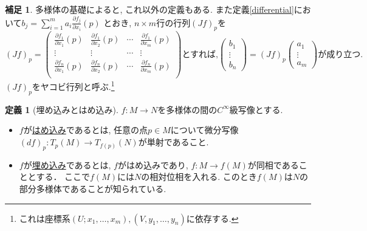 \documentclass[dvipdfmx,a4paper,11pt]{article}
\newcommand{\R}{\mathbb{R}}
\theoremstyle{definition}
\newtheorem{dfn}[thm]{定義}
\newtheorem{rem}[thm]{補足}
\newcommand{\pdrv}[2]{\frac{\partial #1}{\partial #2}}
\begin{document}
    
    \begin{rem}
 多様体の基礎によると, これ以外の定義もある.    
また定義\ref{differential}において$b_j = \sum_{i=1}^{m} a_i  \pdrv{f_{j}}{x_i}(p) $ とおき, $n \times m$行の行列$(Jf)_{p}$を
   $$
   (Jf)_{p} = 
   \begin{pmatrix}
   \pdrv{f_{1}}{x_1}(p) & \pdrv{f_{1}}{x_2}(p)  & \cdots & \pdrv{f_{1}}{x_m}(p) \\
   \vdots& \vdots& \cdots & \vdots \\
   \pdrv{f_{n}}{x_1}(p) & \pdrv{f_{n}}{x_2}(p)  & \cdots & \pdrv{f_{n}}{x_m}(p) \\
   \end{pmatrix}
   \text{とすれば,} 
   \begin{pmatrix}
   b_1 \\ \vdots \\ b_n 
   \end{pmatrix}
   =
   (Jf)_{p} 
   \begin{pmatrix}
   a_1 \\ \vdots \\ a_m
   \end{pmatrix}
      \text{が成り立つ.} 
   $$
 $(Jf)_{p} $をヤコビ行列と呼ぶ.\footnote{これは座標系$(U; x_1, \ldots, x_m),(V, y_1, \ldots, y_n)$に依存する. } 

    \end{rem}






\begin{tcolorbox}[
    colback = white,
    colframe = green!35!black,
    fonttitle = \bfseries,
    breakable = true]
    \begin{dfn}[埋め込みとはめ込み]
    $f : M \rightarrow N$を多様体の間の$C^{\infty}$級写像とする. 
    \begin{itemize}
         \setlength{\parskip}{0cm}
  \setlength{\itemsep}{0pt} 
    \item $f$が\underline{はめ込み}であるとは, 任意の点$p \in M$について微分写像$(df)_{p} : T_{p}(M) \rightarrow T_{f(p)}(N)$が単射であること.
    \item $f$が\underline{埋め込み}であるとは, $f$がはめ込みであり, $f : M \rightarrow f(M)$が同相であることとする． ここで$f(M)$には$N$の相対位相を入れる. このとき$f(M)$は$N$の部分多様体であることが知られている. 
    \end{itemize}

    \end{dfn}
    \end{tcolorbox}
    
\end{document}

